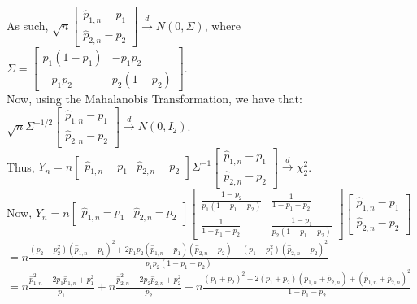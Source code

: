 \documentclass[12pt]{article}
\begin{document}
\noindent
As such, $\sqrt{n} \left[ \begin{array}{c} \hat{p}_{1,n}-p_1\\ \hat{p}_{2,n}-p_2 \end{array} \right] \overset{d}\to N(0,\Sigma)$, where
$\Sigma = \left[ \begin{array}{cc} p_1(1-p_1) & -p_1p_2\\ -p_1p_2 & p_2(1-p_2) \end{array} \right]$.\\

\noindent
Now, using the Mahalanobis Transformation, we have that: 
$\sqrt{n}\Sigma^{-1/2} \left[ \begin{array}{c} \hat{p}_{1,n}-p_1\\ \hat{p}_{2,n}-p_2 \end{array} \right] 
\overset{d}\to N(0,I_2)$.\\

\noindent
Thus, $Y_n = n \left[ \begin{array}{cc} \hat{p}_{1,n}-p_1& \hat{p}_{2,n}-p_2 \end{array} \right] 
\Sigma^{-1} \left[ \begin{array}{c} \hat{p}_{1,n}-p_1\\ \hat{p}_{2,n}-p_2 \end{array} \right] 
\overset{d}\to \chi^2_2$.\\

\noindent
Now, $Y_n = n \left[ \begin{array}{cc} \hat{p}_{1,n}-p_1& \hat{p}_{2,n}-p_2 \end{array} \right] 
\left[ \begin{array}{cc} \frac{1-p_2}{p_1(1-p_1-p_2)} & \frac{1}{1-p_1-p_2}\\ 
\frac{1}{1-p_1-p_2} & \frac{1-p_1}{p_2(1-p_1-p_2)} \end{array} \right] 
\left[ \begin{array}{c} \hat{p}_{1,n}-p_1\\ \hat{p}_{2,n}-p_2 \end{array} \right] $\\

\indent\indent
$= n\frac{(p_2-p_2^2)(\hat{p}_{1,n}-p_1)^2+2p_1p_2(\hat{p}_{1,n}-p_1)(\hat{p}_{2,n}-p_2)+(p_1-p_1^2)(\hat{p}_{2,n}-p_2)^2}{p_1p_2(1-p_1-p_2)}$\\

\indent\indent
$= n\frac{\hat{p}_{1,n}^2-2p_1\hat{p}_{1,n}+p_1^2}{p_1}
+n\frac{\hat{p}_{2,n}^2-2p_2\hat{p}_{2,n}+p_2^2}{p_2}
+n\frac{(p_1+p_2)^2-2(p_1+p_2)(\hat{p}_{1,n}+\hat{p}_{2,n})+(\hat{p}_{1,n}+\hat{p}_{2,n})^2}{1-p_1-p_2}$\\
\end{document}
